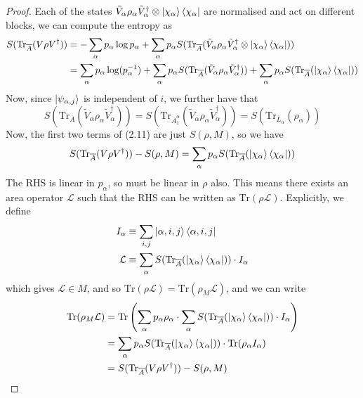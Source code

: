 \documentclass[12pt,a4paper]{article}
\numberwithin{equation}{section}
\newcommand{\ketbra}[2]{\ket{#1}\bra{#2}}
\newcommand{\ketbras}[1]{\ketbra{#1}{#1}}
\newcommand{\ol}[1]{\overline{#1}}
\theoremstyle{definition}
\theoremstyle{theorem}
\theoremstyle{example}
\begin{document}
\begin{itemize}
\begin{proof}
			Each of the states $\tilde{V}_{\alpha}\rho_{\alpha}\tilde{V}_{\alpha}^{\dagger}\otimes\ketbras{\chi_{\alpha}}$ are normalised and act on different blocks, we can compute the entropy as
			\begin{equation}
				\begin{aligned}
					S(\text{Tr}_{\ol{A}}(V\rho V^{\dagger}))&=-\sum_{\alpha}p_{\alpha}\log{p_{\alpha}}+\sum_{\alpha}p_{\alpha}S(\text{Tr}_{\ol{A}}(\tilde{V}_{\alpha}\rho_{\alpha}\tilde{V}_{\alpha}^{\dagger}\otimes\ketbras{\chi_{\alpha}}))\\&=\sum_{\alpha}p_{\alpha}\log(p_{\alpha}^{-1})+\sum_{\alpha}p_{\alpha}S(\text{Tr}_{\ol{A}}(\tilde{V}_{\alpha}\rho_{\alpha}\tilde{V}_{\alpha}^{\dagger}))+\sum_{\alpha}p_{\alpha}S(\text{Tr}_{\ol{A}}(\ketbras{\chi_{\alpha}}))
				\end{aligned}
			\end{equation}
			Now, since $\ket{\psi_{\alpha,j}}$ is independent of $i$, we further have that
			\begin{equation}
				S(\text{Tr}_{\ol{A}}(\tilde{V}_{\alpha}\rho_{\alpha}\tilde{V}_{\alpha}^{\dagger}))=S(\text{Tr}_{\ol{A}_{1}^{\alpha}}(\tilde{V}_{\alpha}\rho_{\alpha}\tilde{V}_{\alpha}^{\dagger}))=S(\text{Tr}_{\ol{L}_{\alpha}}(\rho_{\alpha}))
			\end{equation}
			Now, the first two terms of (2.11) are just $S(\rho,M)$, so we have
			\begin{equation}
				S(\text{Tr}_{\ol{A}}(V\rho V^{\dagger}))-S(\rho,M)=\sum_{\alpha}p_{\alpha}S(\text{Tr}_{\ol{A}}(\ketbras{\chi_{\alpha}}))
			\end{equation}
			The RHS is linear in $p_{\alpha}$, so must be linear in $\rho$ also. This means there exists an area operator $\mathcal{L}$ such that the RHS can be written as $\text{Tr}(\rho\mathcal{L})$. Explicitly, we define
			\begin{equation}
				\begin{aligned}
					I_{\alpha}&\equiv \sum_{i,j}\ketbras{\alpha,i,j}\\
					\mathcal{L}&\equiv\sum_{\alpha}S(\text{Tr}_{\ol{A}}(\ketbras{\chi_{\alpha}}))\cdot I_{\alpha}
				\end{aligned}
			\end{equation}
			which gives $\mathcal{L}\in M$, and so $\text{Tr}(\rho\mathcal{L})=\text{Tr}(\rho_{M}\mathcal{L})$, and we can write
			\begin{equation}
				\begin{aligned}
					\text{Tr}(\rho_{M}\mathcal{L})&=\text{Tr}\left(\sum_{\alpha}p_{\alpha}\rho_{\alpha}\cdot\sum_{\alpha}S(\text{Tr}_{\ol{A}}(\ketbras{\chi_{\alpha}}))\cdot I_{\alpha}\right)\\&=\sum_{\alpha}p_{\alpha}S(\text{Tr}_{\ol{A}}(\ketbras{\chi_{\alpha}}))\cdot \text{Tr}(\rho_{\alpha}I_{\alpha})\\&=S(\text{Tr}_{\ol{A}}(V\rho V^{\dagger}))-S(\rho,M)

\end{aligned}
\end{equation}
\end{proof}
\end{itemize}
\end{document}
